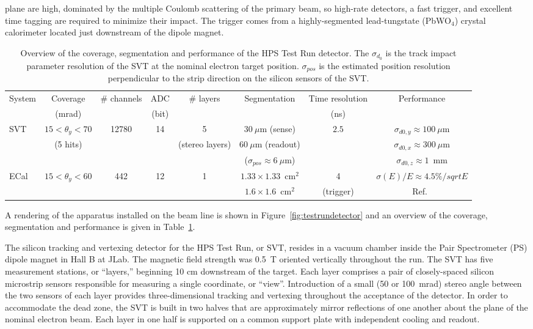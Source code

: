 \documentclass[final,3p,times,twocolumn]{elsarticle}
\begin{document}
plane are high, dominated by the
multiple Coulomb scattering of the primary beam, so high-rate detectors, a fast trigger, 
and excellent time tagging are required to minimize their impact.  
The trigger comes from a highly-segmented  lead-tungstate (PbWO$_{4}$) crystal calorimeter located just 
downstream of the dipole magnet. 
\begin{center}
\begin{table}[t]
{\small
\caption{Overview of the coverage, segmentation and performance of the HPS Test Run detector. The $\sigma_{d_0}$ is the track impact parameter resolution of the SVT at the nominal electron target position.  $\sigma_{pos}$ is the estimated position resolution perpendicular to the strip direction on the silicon sensors of the SVT.
\label{tab:detector-overview}}
\begin{tabular}{lccccccc}
\hline 
System & Coverage & \# channels & ADC & \# layers & Segmentation & Time resolution  & Performance \\
 & (mrad) &  & (bit) & &  & (ns)  &  \\
\hline
SVT & $15<\theta_{y} < 70$ & 12780 & 14 & 5    & $30~\mu$m (sense) & $2.5$& $\sigma_{d0,y}  \approx 100~\mu$m \\
& (5 hits) &  &  & (stereo layers) & $60~\mu$m (readout)  & & $\sigma_{d0,x} \approx 300~\mu$m \\
& &  &  &  & ($\sigma_{pos} \approx 6~\mu$m) &  & $\sigma_{d0,z}\approx 1$~mm \\
\hline
ECal & $15<\theta_{y} < 60$ & 442 & 12  & 1  & $1.33\times1.33$~cm$^2$ & 4  & $\sigma(E)/E \approx 4.5\%/sqrt{E}$ \\ 
 &  &  &   &  & $1.6\times1.6$~cm$^2$  & (trigger)& Ref.~\cite{clas_ecal,clas_ecal2,clas_thesis}  \\ 
\hline
\end{tabular}
}
\end{table}
\end{center}
A rendering of the apparatus installed on the beam line is shown in 
Figure~\ref{fig:testrundetector} and an overview of the coverage, segmentation and performance is 
given in Table~\ref{tab:detector-overview}.  

The silicon tracking and vertexing detector for the HPS Test Run, or SVT, resides in a vacuum 
chamber inside the Pair Spectrometer (PS) dipole magnet in Hall B at JLab. The magnetic field 
strength was 0.5~T oriented vertically throughout the run. The SVT has five 
measurement stations, or ``layers,'' beginning 10 cm downstream of the target. Each layer 
comprises a pair of closely-spaced silicon microstrip sensors responsible for measuring a single 
coordinate, or ``view''. Introduction of a small (50 or 100~mrad) stereo angle between the two 
sensors of each layer provides three-dimensional tracking and vertexing throughout the acceptance 
of the detector. In order to accommodate the dead zone, the 
SVT is built in two halves that are approximately mirror reflections of one another about the plane of the 
nominal electron beam.  Each layer in one half is supported on a common support plate with 
independent cooling and readout. 
\end{document}
